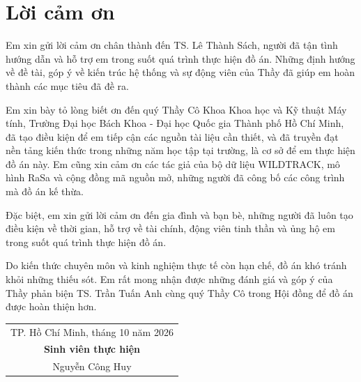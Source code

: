 \chapter*{Lời cảm ơn}

Em xin gửi lời cảm ơn chân thành đến TS. Lê Thành Sách, người đã tận tình hướng dẫn và hỗ trợ em trong suốt quá trình thực hiện đồ án. Những định hướng về đề tài, góp ý về kiến trúc hệ thống và sự động viên của Thầy đã giúp em hoàn thành các mục tiêu đã đề ra.

Em xin bày tỏ lòng biết ơn đến quý Thầy Cô Khoa Khoa học và Kỹ thuật Máy tính, Trường Đại học Bách Khoa - Đại học Quốc gia Thành phố Hồ Chí Minh, đã tạo điều kiện để em tiếp cận các nguồn tài liệu cần thiết, và đã truyền đạt nền tảng kiến thức trong những năm học tập tại trường, là cơ sở để em thực hiện đồ án này. Em cũng xin cảm ơn các tác giả của bộ dữ liệu WILDTRACK, mô hình RaSa và cộng đồng mã nguồn mở, những người đã công bố các công trình mà đồ án kế thừa.

Đặc biệt, em xin gửi lời cảm ơn đến gia đình và bạn bè, những người đã luôn tạo điều kiện về thời gian, hỗ trợ về tài chính, động viên tinh thần và ủng hộ em trong suốt quá trình thực hiện đồ án.

Do kiến thức chuyên môn và kinh nghiệm thực tế còn hạn chế, đồ án khó tránh khỏi những thiếu sót. Em rất mong nhận được những đánh giá và góp ý của Thầy phản biện TS. Trần Tuấn Anh cùng quý Thầy Cô trong Hội đồng để đồ án được hoàn thiện hơn.

\vspace{1cm}
\begin{flushright}
\begin{tabular}{c}
    TP. Hồ Chí Minh, tháng 10 năm 2026 \\
    \textbf{Sinh viên thực hiện} \\[0.3cm]
    Nguyễn Công Huy
\end{tabular}
\end{flushright}
